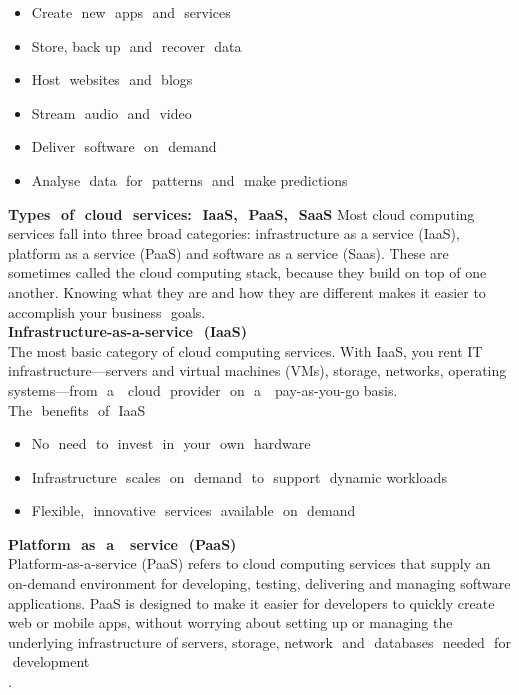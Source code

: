 \documentclass[a4paper,12pt]{report}
\begin{document}
\begin{itemize}
	\item Create​ ​ new​ ​ apps​ ​ and​ ​ services
	\item Store, back​ up​ ​ and​ ​ recover​ ​ data
	\item Host​ ​ websites​ ​ and​ ​ blogs
	\item Stream​ ​ audio​ ​ and​ ​ video
	\item Deliver​ ​ software​ ​ on​ ​ demand
	\item Analyse​ ​ data​ ​ for​ ​ patterns​ ​ and​ ​ make​ ​predictions\\
\end{itemize}
\textbf{Types​ ​ of​ ​ cloud​ ​ services:​ ​ IaaS,​ ​ PaaS,​ ​ SaaS}
Most cloud computing services fall into three broad categories: infrastructure as a service
(IaaS), platform as a service (PaaS) and software as a service (Saas). These are
sometimes called the cloud computing stack, because they build on top of one another.
Knowing what they are and how they are different makes it easier to accomplish your
business​ ​ goals.\\
\newline
\textbf{Infrastructure-as-a-service​ ​ (IaaS)}\\
The most basic category of cloud computing services. With IaaS, you rent IT
infrastructure—servers and virtual machines (VMs), storage, networks, operating
systems—from​ ​ a ​ ​ cloud​ ​ provider​ ​ on​ ​ a ​ ​ pay-as-you-go​ ​ basis.\\
The​ ​ benefits​ ​ of​ ​ IaaS
\begin{itemize}
	\item No​ ​ need​ ​ to​ ​ invest​ ​ in​ ​ your​ ​ own​ ​ hardware
	\item Infrastructure​ ​ scales​ ​ on​ ​ demand​ ​ to​ ​ support​ ​ dynamic​ ​ workloads
	\item Flexible,​ ​ innovative​ ​ services​ ​ available​ ​ on​ ​ demand\\
\end{itemize}
\textbf{Platform​ ​ as​ ​ a ​ ​ service​ ​ (PaaS)}\\
Platform-as-a-service (PaaS) refers to cloud computing services that supply an on-demand
environment for developing, testing, delivering and managing software applications. PaaS is
designed to make it easier for developers to quickly create web or mobile apps, without
worrying about setting up or managing the underlying infrastructure of servers, storage,
network​ ​ and​ ​ databases​ ​ needed​ ​ for​ ​ development\\.
\end{document}

